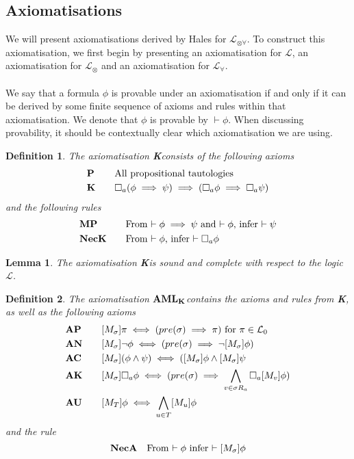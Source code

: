 \documentclass[12pt, a4paper, titlepage]{article}
\newtheorem{defn}{Definition}[subsection]
\newtheorem{lemma}{Lemma}[subsection]
\numberwithin{equation}{section}
\newcommand{\sqex}[1]{[{#1}]}
\newcommand{\lang}{\mathcal{L}}
\newcommand{\langRefine}{\lang_{\forall}}
\newcommand{\langActEx}{\lang_{\otimes}}
\newcommand{\langArbAct}{\lang_{\otimes\forall}}
\newcommand{\langProp}{\lang_0}
\newcommand{\AXK}{{\bf K}}
\newcommand{\AXAML}{${\bf AML_{\AXK}}$}
\newcommand{\axP}{{\bf P}}
\newcommand{\axK}{{\bf K}}
\newcommand{\axMP}{{\bf MP}}
\newcommand{\axNecK}{{\bf NecK}}
\newcommand{\axAN}{{\bf AN}}
\newcommand{\axAP}{{\bf AP}}
\newcommand{\axAC}{{\bf AC}}
\newcommand{\axAK}{{\bf AK}}
\newcommand{\axAU}{{\bf AU}}
\newcommand{\axNecA}{{\bf NecA}}
\begin{document}
\subsection{Axiomatisations}
We will present axiomatisations derived by Hales for $\langArbAct$.
To construct this axiomatisation, we first begin by presenting an axiomatisation for $\lang$, an
axiomatisation for $\langActEx$ and an axiomatisation for $\langRefine$.\\
\\
We say that a formula $\phi$ is provable under an axiomatisation if and only if it can be derived by
some finite sequence of axioms and rules within that axiomatisation.
We denote that $\phi$ is provable by $\vdash \phi$.
When discussing provability, it should be contextually clear which axiomatisation we are using.

\begin{defn} \label{axiomK}
The axiomatisation \AXK consists of the following axioms
\begin{alignat*}{2}
	& \axP && \quad \text{All propositional tautologies} \\
	& \axK && \quad \Box_a(\phi \implies \psi) \implies (\Box_a \phi \implies \Box_a \psi)
\end{alignat*}
and the following rules
\begin{alignat*}{2}
	& \axMP && \quad \text{From $\vdash \phi \implies \psi$ and $\vdash \phi$, infer $\vdash \psi$} \\
	& \axNecK && \quad \text{From $\vdash \phi$, infer $\vdash \Box_a \phi$}
\end{alignat*}
\end{defn}

\begin{lemma} \label{axiomKSoundComplete}
The axiomatisation \AXK is sound and complete with respect to the logic $\lang$.
\end{lemma}

\begin{defn} \label{axiomAML}
The axiomatisation \AXAML contains the axioms and rules from \AXK, as well as the following axioms
\begin{alignat*}{2}
	& \axAP && \quad \sqex{M_\sigma}\pi \iff (pre(\sigma) \implies \pi) \text{ for $\pi \in \langProp$}\\
	& \axAN && \quad \sqex{M_\sigma} \neg \phi \iff (pre(\sigma) \implies \neg \sqex{M_\sigma} \phi)\\
	& \axAC && \quad \sqex{M_\sigma}(\phi \land \psi) \iff (\sqex{M_\sigma}\phi \land \sqex{M_\sigma}\psi\\
	& \axAK && \quad \sqex{M_\sigma}\Box_a\phi \iff (pre(\sigma) \implies \bigwedge_{v \in \sigma R_a}
		\Box_a \sqex{M_v} \phi) \\
	& \axAU && \quad \sqex{M_T} \phi \iff \bigwedge_{u \in T} \sqex{M_u} \phi
\end{alignat*}
and the rule
\[
	\axNecA \quad \text{From $\vdash \phi$ infer $\vdash \sqex{M_\sigma} \phi$}
\]
\end{defn}
\end{document}
